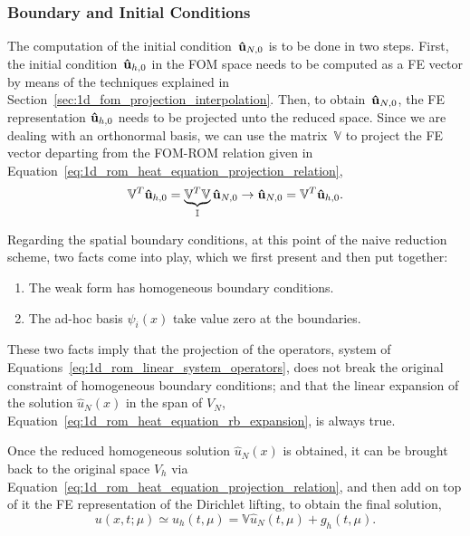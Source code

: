 \documentclass[../main.tex]{subfiles}
\newcommand{\rbV}{\ensuremath{\mathbb{V}}}
\newcommand{\rbVT}{\ensuremath{\rbV^T}}
\begin{document}
\subsubsection{Boundary and Initial Conditions}
The computation of the initial condition~$\vb{\hat{u}}_{N,0}$ is to be done in two steps. 
First, the initial condition~$\vb{\hat{u}}_{h,0}$ in the FOM space needs to be computed as a FE vector by means of the techniques explained in Section~\ref{sec:1d_fom_projection_interpolation}.
Then, to obtain~$\vb{\hat{u}}_{N,0}$, the FE representation $\vb{\hat{u}}_{h,0}$ needs to be projected unto the reduced space. 
Since we are dealing with an orthonormal basis, we can use the matrix~$\rbV$ to project the FE vector departing from the \mbox{FOM-ROM} relation given in Equation~\eqref{eq:1d_rom_heat_equation_projection_relation},
\begin{equation}
    \rbVT \vb{\hat{u}}_{h,0} = \underbrace{\rbVT \rbV}_{\mathbb{I}} \vb{\hat{u}}_{N,0} 
    \rightarrow 
    \vb{\hat{u}}_{N,0} = \rbVT \vb{\hat{u}}_{h,0}.
\end{equation}

Regarding the spatial boundary conditions, at this point of the naive reduction scheme, two facts come into play, which we first present and then put together:
\begin{enumerate}
    \item The weak form has homogeneous boundary conditions.
    \item The ad-hoc basis $\psi_i(x)$ take value zero at the boundaries.
\end{enumerate}
These two facts imply that the projection of the operators, system of Equations~\eqref{eq:1d_rom_linear_system_operators}, does not break the original constraint of homogeneous boundary conditions;
and that the linear expansion of the solution $\hat{u}_N(x)$ in the span of $V_N$, Equation~\eqref{eq:1d_rom_heat_equation_rb_expansion}, is always true.

Once the reduced homogeneous solution $\hat{u}_N(x)$ is obtained, it can be brought back to the original space $V_h$ via Equation~\eqref{eq:1d_rom_heat_equation_projection_relation}, and then add on top of it the FE representation of the Dirichlet lifting, to obtain the final solution,
\begin{equation}
    u(x, t; \mu) \simeq u_h(t, \mu) = \rbV \hat{u}_N(t, \mu) + g_h(t,\mu).
\end{equation}
\end{document}
